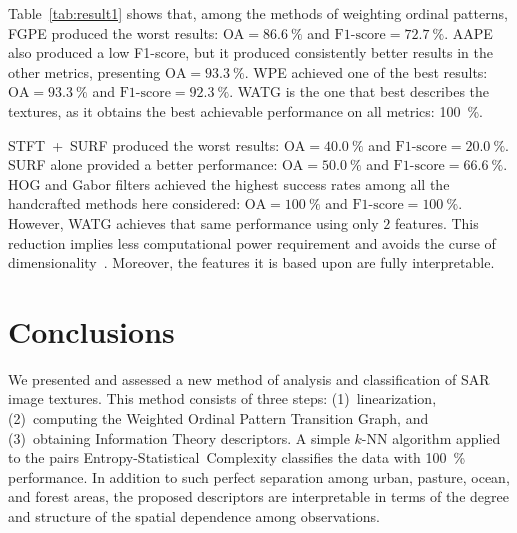 \documentclass[journal]{IEEEtran}
\begin{document}
Table~\ref{tab:result1} shows that, among the methods of weighting ordinal patterns, FGPE produced the worst results: $\text{OA}=\SI{86.6}{\percent}$ and $\text{F1-score}=\SI{72.7}{\percent}$.
%
AAPE also produced a low F1-score, but it produced consistently better results in the other metrics, presenting $\text{OA} = \SI{93.3}{\percent}$.
%
WPE achieved one of the best results: $\text{OA}=\SI{93.3}{\percent}$ and $\text{F1-score}=\SI{92.3}{\percent}$.
%
WATG is the one that best describes the textures, as it obtains the best achievable performance on all metrics: \SI{100}{\percent}.

\mbox{STFT + SURF} produced the worst results: $\text{OA}=\SI{40.0}{\percent}$ and $\text{F1-score}=\SI{20.0}{\percent}$.
%
SURF alone provided a better performance:  $\text{OA}=\SI{50.0}{\percent}$ and $\text{F1-score}=\SI{66.6}{\percent}$.
%
%
HOG and Gabor filters achieved the highest success rates
among all the handcrafted methods here considered: $\text{OA} = \SI{100}{\percent}$ and $\text{F1-score} = \SI{100}{\percent}$.
However, WATG achieves that same performance using only $2$ features.
This reduction implies less computational power requirement and avoids the curse of dimensionality~\cite{TheCursesofDimensionality2018}.
Moreover, the features it is based upon are fully interpretable.

\section{Conclusions}\label{Conclusion}

We presented and assessed a new method of analysis and classification of SAR image textures.
This method consists of three steps: 
(1)~linearization, 
(2)~computing the Weighted Ordinal Pattern Transition Graph, and 
(3)~obtaining Information Theory descriptors.
A simple $k$-NN algorithm applied to the pairs Entropy-Statistical~Complexity classifies the data with \SI{100}{\percent} performance.
In addition to such perfect separation among urban, pasture, ocean, and forest areas, the proposed descriptors are interpretable in terms of the degree and structure of the spatial dependence among observations.
\end{document}
